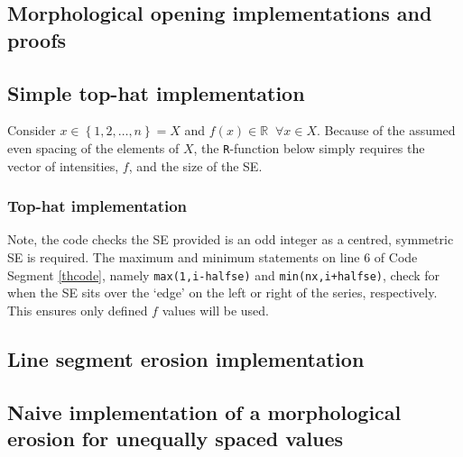 \documentclass[12pt,a4paper,oneside]{report}
\begin{document}
\begin{appendix}






\chapter{Morphological opening implementations and proofs} \label{app:morph}

\section{Simple top-hat implementation} \label{lsa}

Consider $x \in \left\{ 1,2,\ldots,n \right\} = X$ and $ f \left( x \right) \in \mathds{R} \; \; \forall x \in X$. Because of the assumed even spacing of the elements of $X$, the {\tt R}-function below simply requires the vector of intensities, $f$, and the size of the SE. 


\subsection{Top-hat implementation}






Note, the code checks the SE provided is an odd integer as a centred, symmetric SE is required. The maximum and minimum statements on line 6 of Code Segment \ref{thcode}, namely {\tt max(1,i-halfse)} and {\tt min(nx,i+halfse)}, check for when the SE sits over the `edge' on the left or right of the series, respectively. This ensures only defined $f$ values will be used. 
	
\section{Line segment erosion implementation} \label{lsaR}


	


		
\section[Naive implementation: unequally spaced values]{Naive implementation of a morphological erosion for unequally spaced values} \label{naiveclsa}


\end{appendix}
\end{document}
